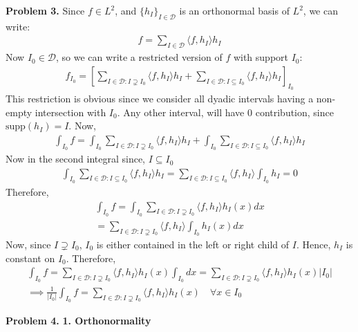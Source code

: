 \documentclass{article}
\newcommand{\supp}{\text{supp}}
\begin{document}
\textbf{Problem 3. } Since $f \in L^2$, and $\{h_I\}_{I \in \mathcal{D}}$ is an orthonormal basis of $L^2$, we can write:
\begin{gather*}
    f = \sum_{I \in \mathcal{D}} \langle f, h_I \rangle h_I
\end{gather*}
Now $I_0 \in \mathcal{D}$, so we can write a restricted version of $f$ with support $I_0$:
\begin{gather*}
    f_{I_0} = \left[ \sum_{I \in \mathcal{D}: I \supsetneq I_0} \langle f, h_I \rangle h_I + \sum_{I \in \mathcal{D}: I \subseteq I_0} \langle f, h_I \rangle h_I  \right]_{I_0}
\end{gather*}
This restriction is obvious since we consider all dyadic intervals having a non-empty intersection with $I_0$. Any other interval, will have $0$ contribution, since $\supp(h_I) = I$. Now,
\begin{gather*}
    \int_{I_0} f = \int_{I_0} \sum_{I \in \mathcal{D}: I \supsetneq I_0} \langle f, h_I \rangle h_I + \int_{I_0} \sum_{I \in \mathcal{D}: I \subseteq I_0} \langle f, h_I \rangle h_I
\end{gather*}
Now in the second integral since, $I \subseteq I_0$
\begin{gather*}
    \int_{I_0} \sum_{I \in \mathcal{D}: I \subseteq I_0} \langle f, h_I \rangle h_I = \sum_{I \in \mathcal{D}: I \subseteq I_0} \langle f, h_I \rangle \int_{I_0} h_I = 0
\end{gather*}
Therefore,
\begin{gather*}
    \int_{I_0} f = \int_{I_0} \sum_{I \in \mathcal{D}: I \supsetneq I_0} \langle f, h_I \rangle h_I (x) dx\\
    = \sum_{I \in \mathcal{D}: I \supsetneq I_0} \langle f, h_I \rangle \int_{I_0} h_I (x) dx
\end{gather*}
Now, since $I \supsetneq I_0$, $I_0$ is either contained in the left or right child of $I$. Hence, $h_I$ is constant on $I_0$. Therefore,
\begin{gather*}
    \int_{I_0} f = \sum_{I \in \mathcal{D}: I \supsetneq I_0} \langle f, h_I \rangle h_I (x) \int_{I_0} dx = \sum_{I \in \mathcal{D}: I \supsetneq I_0} \langle f, h_I \rangle h_I (x) |I_0|\\
    \implies \frac{1}{|I_0|}\int_{I_0} f = \sum_{I \in \mathcal{D}: I \supsetneq I_0} \langle f, h_I \rangle h_I (x) \quad \forall x \in I_0
\end{gather*}


\textbf{Problem 4. } \textbf{1. Orthonormality}
\\~
\end{document}
